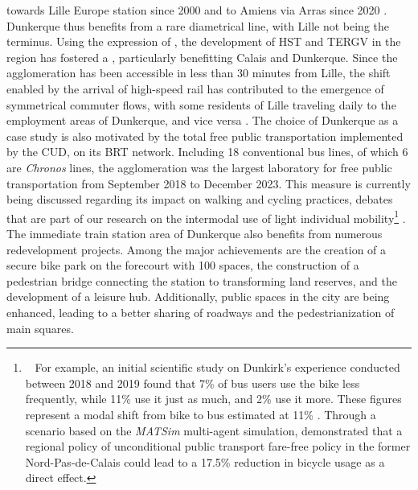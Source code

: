 \begin{refsegment}
{} towards Lille Europe station since 2000 and to Amiens via Arras since 2020 \textcolor{blue}{\autocite[85-86]{bourdin_major_2024}}. Dunkerque thus benefits from a rare diametrical line, with Lille not being the terminus. Using the expression of \textcolor{blue}{\textcite[102-103]{chen_wider_2012}}, the development of \acrshort{HST} and \acrshort{TERGV} in the region has fostered a , particularly benefitting Calais and Dunkerque. Since the agglomeration has been accessible in less than 30 minutes from Lille, the shift enabled by the arrival of high-speed rail has contributed to the emergence of symmetrical commuter flows, with some residents of Lille traveling daily to the employment areas of Dunkerque, and vice versa \textcolor{blue}{\autocite[4]{deroo_deplacements_2008}}. The choice of Dunkerque as a case study is also motivated by the total free public transportation implemented by the \acrfull{CUD}, on its \acrshort{BRT} network. Including 18 conventional bus lines, of which 6 are \textsl{Chronos} lines, the agglomeration was the largest laboratory for free public transportation from September 2018 to December 2023. This measure is currently being discussed regarding its impact on walking and cycling practices, debates that are part of our research on the intermodal use of light individual mobility\footnote{~
    For example, an initial scientific study on Dunkirk's experience conducted between 2018 and 2019 found that 7\% of bus users use the bike less frequently, while 11\% use it just as much, and 2\% use it more. These figures represent a modal shift from bike to bus estimated at 11\% \textcolor{blue}{\autocite[25]{javary_gratuite_2020}}. Through a scenario based on the \textsl{MATSim} multi-agent simulation, \textcolor{blue}{\textcite[10]{kilani_multimodal_2022}} demonstrated that a regional policy of unconditional public transport fare-free policy in the former Nord-Pas-de-Calais could lead to a 17.5\% reduction in bicycle usage as a direct effect.
} \textcolor{blue}{\autocites[25]{javary_gratuite_2020}[10]{kilani_multimodal_2022}}. The immediate train station area of Dunkerque also benefits from numerous redevelopment projects. Among the major achievements are the creation of a secure bike park on the forecourt with 100 spaces, the construction of a pedestrian bridge connecting the station to transforming land reserves, and the development of a leisure hub. Additionally, public spaces in the city are being enhanced, leading to a better sharing of roadways and the pedestrianization of main squares.%


\end{refsegment}
